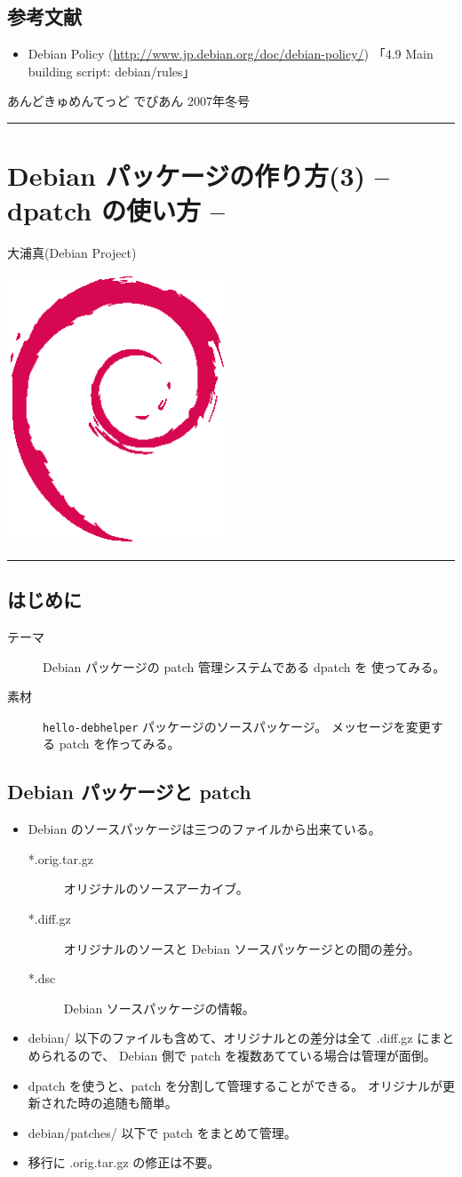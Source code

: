 \documentclass[mingoth,a4paper]{jsarticle}
\renewcommand{\dancersection}[2]{%
\newpage
あんどきゅめんてっど でびあん 2007年冬号
%
\vspace{0.1mm}\\
{\color{dancerlightblue}\rule{\hsize}{2mm}}

%
%
\begin{minipage}[t]{0.7\hsize}
\color{dancerdarkblue}
\vspace{1cm}
\section{#1}
\hfill{}#2\\
\end{minipage}
\begin{minipage}[t]{0.3\hsize}
\vspace{-2cm}
\hfill{}\includegraphics[height=8cm]{image200502/openlogo-nd.eps}\\
\vspace{-5cm}
\end{minipage}
%
%
{\color{dancerdarkblue}\rule{0.74\hsize}{2mm}}
%
\vspace{2cm}
}
\begin{document}
\subsection{参考文献}

\begin{itemize}
\item Debian Policy (\url{http://www.jp.debian.org/doc/debian-policy/})
  「4.9 Main building script: debian/rules」
\end{itemize}

\dancersection{Debian パッケージの作り方(3) -- dpatch の使い方 --}{大浦真(Debian Project)}

\subsection{はじめに}
\begin{description}
\item[テーマ] Debian パッケージの patch 管理システムである dpatch を
  使ってみる。
\item[素材] \texttt{hello-debhelper} パッケージのソースパッケージ。
  メッセージを変更する patch を作ってみる。
\end{description}


\subsection{Debian パッケージと patch}

\begin{itemize}
\item Debian のソースパッケージは三つのファイルから出来ている。
  \begin{description}
  \item[\ttfamily{}*.orig.tar.gz] オリジナルのソースアーカイブ。
  \item[\ttfamily{}*.diff.gz] オリジナルのソースと
    Debian ソースパッケージとの間の差分。
  \item[\ttfamily{}*.dsc] Debian ソースパッケージの情報。
  \end{description}
\item debian/ 以下のファイルも含めて、オリジナルとの差分は全て
  .diff.gz にまとめられるので、
  Debian 側で patch を複数あてている場合は管理が面倒。
\item dpatch を使うと、patch を分割して管理することができる。
  オリジナルが更新された時の追随も簡単。
\item debian/patches/ 以下で patch をまとめて管理。
\item 移行に .orig.tar.gz の修正は不要。
\end{itemize}
\end{document}

